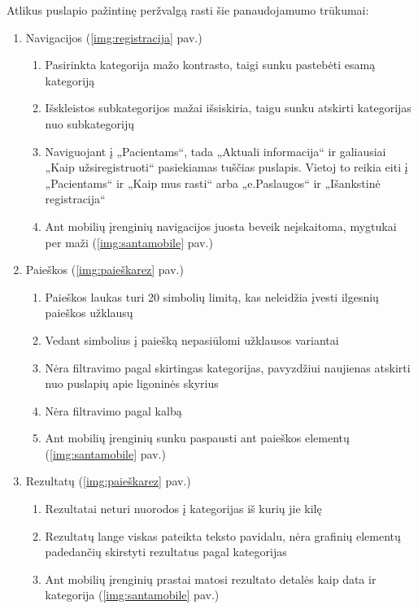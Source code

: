 \documentclass{VUMIFPSkursinis}
\begin{document}
\vspace{0,5cm}
Atlikus puslapio pažintinę peržvalgą rasti šie panaudojamumo trūkumai:
\begin{enumerate}
	\item Navigacijos (\ref{img:registracija} pav.)
	\renewcommand*{\theenumii}{\theenumi.\arabic{enumii}}
	\renewcommand{\labelenumii}{\theenumii}
	\begin{enumerate}
		\item Pasirinkta kategorija mažo kontrasto, taigi sunku pastebėti esamą kategoriją
		\item Išskleistos subkategorijos mažai išsiskiria, taigu sunku atskirti kategorijas nuo subkategorijų
		\item Naviguojant į „Pacientams“, tada „Aktuali informacija“ ir galiausiai „Kaip užsiregistruoti“ pasiekiamas tuščias puslapis. Vietoj to reikia eiti į „Pacientams“ ir „Kaip mus rasti“ arba „e.Paslaugos“ ir „Išankstinė registracija“
		\item Ant mobilių įrenginių navigacijos juosta beveik neįskaitoma, mygtukai per maži (\ref{img:santamobile} pav.)
	\end{enumerate}
	\item Paieškos (\ref{img:paieškarez} pav.)
	\renewcommand*{\theenumii}{\theenumi.\arabic{enumii}}
	\renewcommand{\labelenumii}{\theenumii}
	\begin{enumerate}
		\item Paieškos laukas turi 20 simbolių limitą, kas neleidžia įvesti ilgesnių paieškos užklausų
		\item Vedant simbolius į paiešką nepasiūlomi užklausos variantai
		\item Nėra filtravimo pagal skirtingas kategorijas, pavyzdžiui naujienas atskirti nuo puslapių apie ligoninės skyrius
		\item Nėra filtravimo pagal kalbą
		\item Ant mobilių įrenginių sunku paspausti ant paieškos elementų (\ref{img:santamobile} pav.)
	\end{enumerate}
	\item Rezultatų (\ref{img:paieškarez} pav.)
	\renewcommand*{\theenumii}{\theenumi.\arabic{enumii}}
	\renewcommand{\labelenumii}{\theenumii}
	\begin{enumerate}
		\item Rezultatai neturi nuorodos į kategorijas iš kurių jie kilę
		\item Rezultatų lange viskas pateikta teksto pavidalu, nėra grafinių elementų padedančių skirstyti rezultatus pagal kategorijas
		\item Ant mobilių įrenginių prastai matosi rezultato detalės kaip data ir kategorija (\ref{img:santamobile} pav.)
	\end{enumerate}
\end{enumerate}
\vspace{0,5cm}
\end{document}
